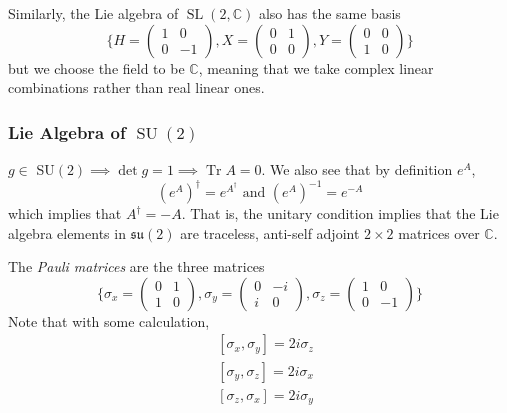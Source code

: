 \documentclass{article}
\DeclareMathOperator{\Tr}{Tr}
\DeclareMathOperator{\SU}{SU}
\DeclareMathOperator{\SL}{SL}
\begin{document}
      Similarly, the Lie algebra of $\SL(2, \mathbb{C})$ also has the same basis 
      \begin{equation}
        \bigg\{ H = \begin{pmatrix}
        1&0\\0&-1
        \end{pmatrix}, X = \begin{pmatrix}
        0&1\\0&0
        \end{pmatrix}, Y = \begin{pmatrix}
        0&0\\1&0
        \end{pmatrix}\bigg\}
      \end{equation}
      but we choose the field to be $\mathbb{C}$, meaning that we take complex linear combinations rather than real linear ones. 

    \subsubsection[Lie Algebra of SU(2)]{Lie Algebra of \(\SU(2)\)}

      $g \in $ SU$(2) \implies \det{g} = 1 \implies \Tr{A} = 0$. We also see that by definition $e^A$, 
      \begin{equation}
        (e^A)^\dagger = e^{A^\dagger} \text{ and } (e^A)^{-1} = e^{-A}
      \end{equation}
      which implies that $A^\dagger = - A$. That is, the unitary condition implies that the Lie algebra elements in $\mathfrak{su}(2)$ are traceless, anti-self adjoint $2 \times 2$ matrices over $\mathbb{C}$. 

      \begin{definition}
        The \textit{Pauli matrices} are the three matrices
        \begin{equation}
          \bigg\{ \sigma_x = \begin{pmatrix}
          0&1\\1&0
          \end{pmatrix}, \sigma_y = \begin{pmatrix}
          0&-i\\i&0
          \end{pmatrix}, \sigma_z = \begin{pmatrix}
          1&0\\0&-1
          \end{pmatrix}\bigg\}
        \end{equation}
        Note that with some calculation, 
        \begin{align*}
          & [\sigma_x, \sigma_y] = 2 i \sigma_z \\
          & [\sigma_y, \sigma_z] = 2 i \sigma_x \\
          & [\sigma_z, \sigma_x] = 2 i \sigma_y
        \end{align*}
      \end{definition}
\end{document}
